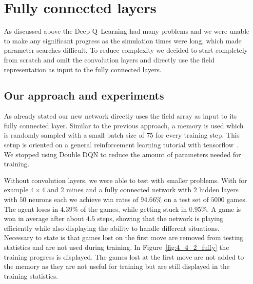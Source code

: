 \chapter{Fully connected layers}
As discussed above the Deep Q--Learning had many problems and we were unable to make any significant progress as the simulation times were long, which made parameter searches difficult.
To reduce complexity we decided to start completely from scratch and omit the convolution layers and directly use the field representation as input to the fully connected layers.

\section{Our approach and experiments}
As already stated our new network directly uses the field array as input to its fully connected layer.
Similar to the previous approach, a memory is used which is randomly sampled with a small batch size of $75$ for every training step.
This setup is oriented on a general reinforcement learning tutorial with tensorflow~\cite{ReLeTut}.
We stopped using Double DQN to reduce the amount of parameters needed for training.

Without convolution layers, we were able to test with smaller problems.
With for example $4 \times 4$ and $2$ mines and a fully connected network with $2$ hidden layers with $50$ neurons each we achieve win rates of $94.66\%$ on a test set of $5000$ games.
The agent loses in $4.39\%$ of the games, while getting stuck in $0.95\%$.
A game is won in average after about $4.5$ steps, showing that the network is playing efficiently while also displaying the ability to handle different situations.
Necessary to state is that games lost on the first move are removed from testing statistics and are not used during training.
In Figure~\ref{fig:4_4_2_fully} the training progress is displayed.
The games lost at the first move are not added to the memory as they are not useful for training but are still displayed in the training statistics.

